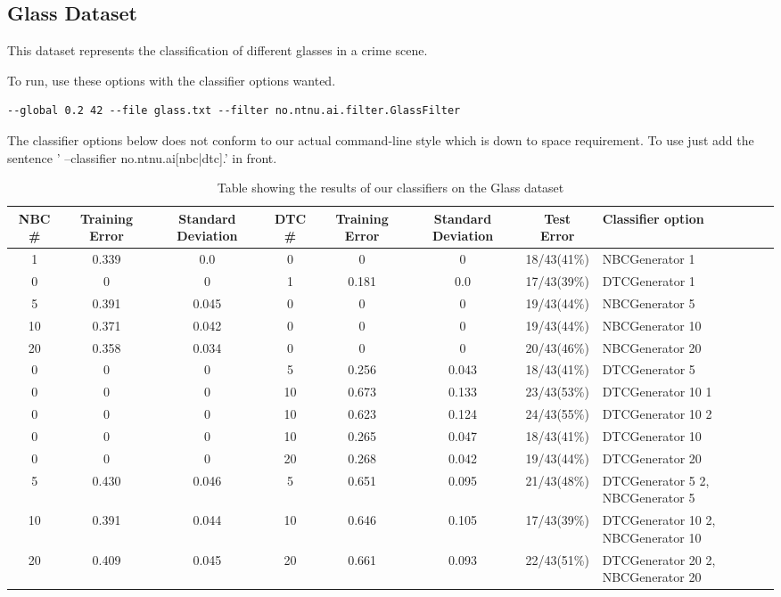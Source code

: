\subsection{Glass Dataset}\label{glass dataset}
This dataset represents the classification of different glasses in a crime scene.

To run, use these options with the classifier options wanted.

\begin{lstlisting}[label=lst:glass, caption=Glass dataset general options]
--global 0.2 42 --file glass.txt --filter no.ntnu.ai.filter.GlassFilter
\end{lstlisting}

The classifier options below does not conform to our actual command-line style
which is down to space requirement. To use just add the sentence '
--classifier no.ntnu.ai[nbc|dtc].' in front.

\begin{sidewaystable}
\begin{tabular}{|c|c|c||c|c|c||c||p{5cm}|}
\hline
NBC \# & Training Error & Standard Deviation & DTC \# & Training Error
& Standard Deviation & Test Error & Classifier option \\ \hline
1 & 0.339 & 0.0 & 0 & 0 & 0 & 18/43(41\%) & NBCGenerator 1 \\ \hline
0 & 0 & 0 & 1 & 0.181 & 0.0 & 17/43(39\%) & DTCGenerator 1 \\ \hline
5 & 0.391 & 0.045 & 0 & 0 & 0 & 19/43(44\%) & NBCGenerator 5 \\ \hline
10 & 0.371 & 0.042 & 0 & 0 & 0 & 19/43(44\%) & NBCGenerator 10 \\ \hline
20 & 0.358 & 0.034 & 0 & 0 & 0 & 20/43(46\%) & NBCGenerator 20 \\ \hline
0 & 0 & 0 & 5 & 0.256 & 0.043 & 18/43(41\%) & DTCGenerator 5 \\ \hline
0 & 0 & 0 & 10 & 0.673 & 0.133 & 23/43(53\%) & DTCGenerator 10 1 \\ \hline
0 & 0 & 0 & 10 & 0.623 & 0.124 & 24/43(55\%) & DTCGenerator 10 2 \\ \hline
0 & 0 & 0 & 10 & 0.265 & 0.047 & 18/43(41\%) & DTCGenerator 10 \\ \hline
0 & 0 & 0 & 20 & 0.268 & 0.042 & 19/43(44\%) & DTCGenerator 20 \\ \hline
5 & 0.430 & 0.046 & 5 & 0.651 & 0.095 & 21/43(48\%) & DTCGenerator 5 2, 
NBCGenerator 5 \\ \hline
10 & 0.391 & 0.044 & 10 & 0.646 & 0.105 & 17/43(39\%) & DTCGenerator 10 2, 
NBCGenerator 10 \\ \hline
20 & 0.409 & 0.045 & 20 & 0.661 & 0.093 & 22/43(51\%) & DTCGenerator 20 2, 
NBCGenerator 20 \\ \hline
\hline
\end{tabular}
\label{tab:glass}
\caption{Table showing the results of our classifiers on the Glass dataset}
\end{sidewaystable}
